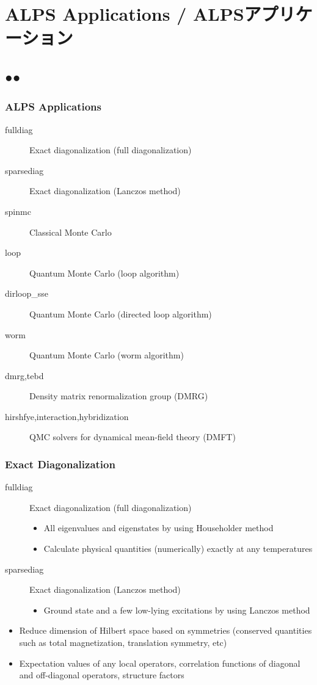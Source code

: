 \section{ALPS Applications / ALPSアプリケーション}
\subsection*{{\protect\color{red}●}{\protect\color{blue}●}}

\begin{frame}[t,fragile]
  \frametitle{ALPS Applications}
  \begin{description}
  \item[fulldiag] Exact diagonalization (full diagonalization)
  \item[sparsediag] Exact diagonalization (Lanczos method)
  \item[spinmc] Classical Monte Carlo
  \item[loop] Quantum Monte Carlo (loop algorithm)
  \item[dirloop\_sse] Quantum Monte Carlo (directed loop algorithm)
  \item[worm] Quantum Monte Carlo (worm algorithm)
  \item[dmrg,tebd] Density matrix renormalization group (DMRG)
  \item[hirshfye,interaction,hybridization] QMC solvers for dynamical mean-field theory (DMFT)
  \end{description}
\end{frame}

\begin{frame}[t,fragile]
  \frametitle{Exact Diagonalization}
  \begin{description}
  \item[fulldiag] Exact diagonalization (full diagonalization)
    \begin{itemize}
    \item All eigenvalues and eigenstates by using Householder method
    \item Calculate physical quantities (numerically) exactly at any temperatures
    \end{itemize}
  \item[sparsediag] Exact diagonalization (Lanczos method)
    \begin{itemize}
    \item Ground state and a few low-lying excitations by using Lanczos method
    \end{itemize}
  \end{description}
  \begin{itemize}
  \item Reduce dimension of Hilbert space based on symmetries (conserved quantities such as total magnetization, translation symmetry, etc)
  \item Expectation values of any local operators, correlation functions of diagonal and off-diagonal operators, structure factors
  \end{itemize}
\end{frame}

